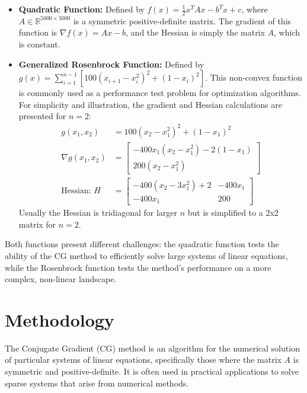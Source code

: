 \documentclass[11pt]{article}
\begin{document}
\begin{itemize}
  \item \textbf{Quadratic Function:} Defined by \( f(x) = \frac{1}{2} x^T A x - b^T x + c \), where 
  \( A \in \mathbb{R}^{5000 \times 5000} \) is a symmetric positive-definite matrix. The gradient of this function is \( \nabla f(x) = Ax - b \), and the Hessian is simply the matrix \( A \), which is constant.

  \item \textbf{Generalized Rosenbrock Function:} Defined by \( g(x) = \sum_{i=1}^{n-1} [100(x_{i+1} - x_i^2)^2 + (1 - x_i)^2] \). This non-convex function is commonly used as a performance test problem for optimization algorithms. For simplicity and illustration, the gradient and Hessian calculations are presented for \( n = 2 \):
  \begin{align*}
    g(x_1, x_2) &= 100(x_2 - x_1^2)^2 + (1 - x_1)^2 \\
    \nabla g(x_1, x_2) &= \begin{bmatrix}
                            -400 x_1 (x_2 - x_1^2) - 2(1 - x_1) \\
                            200 (x_2 - x_1^2)
                          \end{bmatrix} \\
    \text{Hessian: } H &= \begin{bmatrix}
                            -400(x_2 - 3x_1^2) + 2 & -400x_1 \\
                            -400x_1 & 200
                          \end{bmatrix}
  \end{align*}
  Usually the Hessian is tridiagonal for larger \( n \) but is simplified to a 2x2 matrix for \( n = 2 \).
\end{itemize}

Both functions present different challenges: the quadratic function tests the ability of the CG method to efficiently solve large systems of linear equations, while the Rosenbrock function tests the method's performance on a more complex, non-linear landscape.


\section{Methodology}

The Conjugate Gradient (CG) method is an algorithm for the numerical solution of particular systems of linear equations, specifically those where the matrix \( A \) is symmetric and positive-definite. It is often used in practical applications to solve sparse systems that arise from numerical methods.
\end{document}
